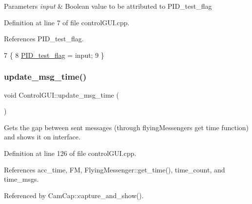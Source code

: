 \begin{DoxyParams}{Parameters}
{\em input} & Boolean value to be attributed to P\+I\+D\+\_\+test\+\_\+flag \\
\hline
\end{DoxyParams}


Definition at line 7 of file control\+G\+U\+I.\+cpp.



References P\+I\+D\+\_\+test\+\_\+flag.


\begin{DoxyCode}
7                                              \{
8     \hyperlink{class_control_g_u_i_a7839defbdc6354cabaa58ceadfe926c3}{PID\_test\_flag} = input;
9 \}
\end{DoxyCode}
\mbox{\label{class_control_g_u_i_a7cdf0036f7b6c8ad8c9fb2a1c36e9c39}} 
\subsubsection{\texorpdfstring{update\+\_\+msg\+\_\+time()}{update\_msg\_time()}}
{\footnotesize\ttfamily void Control\+G\+U\+I\+::update\+\_\+msg\+\_\+time (\begin{DoxyParamCaption}{ }\end{DoxyParamCaption})}



Gets the gap between sent messages (through flying\+Messenger\textquotesingle{}s get time function) and shows it on interface. 



Definition at line 126 of file control\+G\+U\+I.\+cpp.



References acc\+\_\+time, FM, Flying\+Messenger\+::get\+\_\+time(), time\+\_\+count, and time\+\_\+msgs.



Referenced by Cam\+Cap\+::capture\+\_\+and\+\_\+show().


